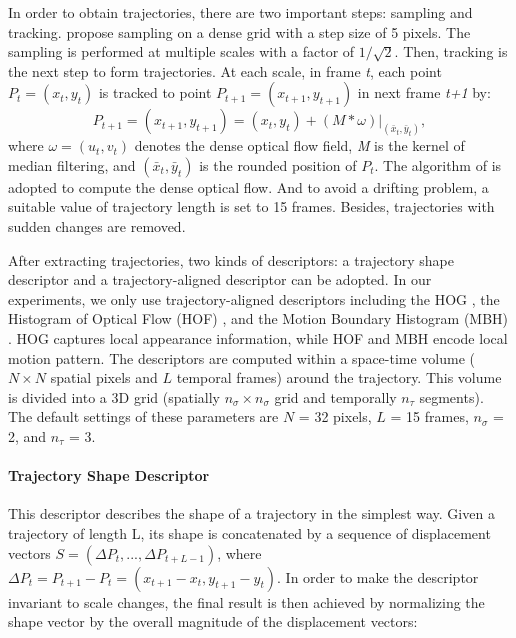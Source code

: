 \documentclass[final,3p,times,twocolumn]{elsarticle}
\begin{document}
In order to obtain trajectories, there are two important steps: sampling and tracking. \cite{wang2011densetraj} propose sampling on a dense grid with a step size of 5 pixels. The sampling is performed at multiple scales with a factor of $1/\sqrt{2}$. Then, tracking is the next step to form trajectories. At each scale, in frame \textit{t}, each point \textit{$P_t = (x_t, y_t)$} is tracked to point \textit{$P_{t+1} = (x_{t+1}, y_{t+1})$} in next frame \textit{t+1} by:
\begin{equation}
	\textit{$P_{t+1} = (x_{t+1}, y_{t+1}) = (x_t, y_t) + (M*\omega)|_{(\bar{x}_t,\bar{y}_t)} $},
\end{equation}
where \textit{$\omega = (u_t, v_t)$} denotes the dense optical flow field, \textit{M} is the kernel of median filtering, and \textit{$(\bar{x}_t,\bar{y}_t)$} is the rounded position of \textit{$P_t$}. The algorithm of \cite{farneback2003two} is adopted to compute the dense optical flow. And to avoid a drifting problem, a suitable value of trajectory length is set to 15 frames. Besides, trajectories with sudden changes are removed.

After extracting trajectories, two kinds of descriptors: a trajectory shape descriptor and a trajectory-aligned descriptor can be adopted. In our experiments, we only use trajectory-aligned descriptors including the HOG \cite{dalal2005histograms}, the Histogram of Optical Flow (HOF) \cite{laptev2008learning}, and the Motion Boundary Histogram (MBH) \cite{dalal2006human}. HOG captures local appearance information, while HOF and MBH encode local motion pattern. The descriptors are computed within a space-time volume ($N \times N$ spatial pixels and $L$ temporal frames) around the trajectory. This volume is divided into a 3D grid (spatially $n_\sigma \times n_\sigma$ grid and temporally $n_\tau$ segments). The default settings of these parameters are $N$ = 32 pixels, $L$ = 15 frames, $n_\sigma$ = 2, and $n_\tau$ = 3.

\iffalse
\paragraph{Trajectory Shape Descriptor}This descriptor describes the shape of a trajectory in the simplest way. Given a trajectory of length L, its shape is concatenated by a sequence of displacement vectors \textit{$S = (\Delta P_t, ..., \Delta P_{t+L-1})$}, where \textit{$\Delta P_t = P_{t+1} - P_t = (x_{t+1} - x_t, y_{t+1} - y_t)$}. In order to make the descriptor invariant to scale changes, the final result is then achieved by normalizing the shape vector by the overall magnitude of the displacement vectors:
\end{document}
